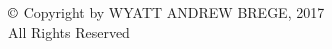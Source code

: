 \label{chap:copyright}

\thispagestyle{empty} %
\begin{center}
  \begin{singlespace}
    \null %
    \vfill
    $\copyright$ Copyright by \uppercase{Wyatt Andrew Brege}, 2017\\
    All Rights Reserved
  \end{singlespace}
\end{center}
\newpage

